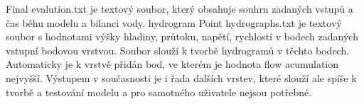 Final evalution.txt je textový soubor, který obsahuje souhrn zadaných vstupů a čas běhu modelu a bilanci vody. 
hydrogram
Point hydrographs.txt je textový soubor s hodnotami výšky hladiny, průtoku, napětí, rychlostí v bodech zadaných vstupní bodovou vrstvou. Soubor slouží k tvorbě hydrogramů v těchto bodech. Automaticky je k vrstvě přidán bod, ve kterém je hodnota flow acumulation nejvyšší.
Výstupem v současnosti je i řada dalších vrstev, které slouží ale spíše k tvorbě a testování modelu a pro samotného uživatele nejsou potřebné.	





